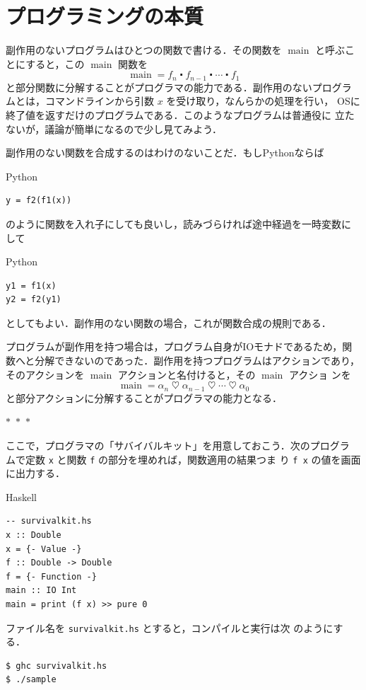 \documentclass[a5paper,twoside,fleqn,draft]{jsbook}
\newcommand{\separator}{\begin{center}$*$~$*$~$*$\end{center}}
\newcommand{\programminglanguage}[1]{\textsf{#1}}
\newcommand{\haskell}{\programminglanguage{Haskell}}
\newcommand{\python}{\programminglanguage{Python}}
\newcommand{\code}[1]{\texttt{#1}}
\newcommand{\filename}[1]{\texttt{#1}}
\newenvironment{haskellcode}{\begin{itembox}[r]{\haskell}}{\end{itembox}}
\newenvironment{pythoncode}{\begin{itembox}[r]{\python}}{\end{itembox}}
\newcommand{\mSpecialFunc}[1]{\mathrm{#1}}
\DeclareMathOperator{\mMainFunc}{\mSpecialFunc{main}}
\newcommand{\mAction}[1]{\mathrm{#1}}
\DeclareMathOperator{\mMain}{\mAction{main}}
\DeclareMathOperator{\mBind}{\heartsuit}
\DeclareMathOperator{\mCompFunc}{\centerdot}
\begin{document}
\section{プログラミングの本質}

副作用のないプログラムはひとつの関数で書ける．その関数を $\mMainFunc$
と呼ぶことにすると，この $\mMainFunc$ 関数を
\begin{equation}
\mMainFunc=f_n\mCompFunc f_{n-1}\mCompFunc\dotsb\mCompFunc f_1
\end{equation}
と部分関数に分解することがプログラマの能力である．副作用のないプログラ
ムとは，コマンドラインから引数 $x$ を受け取り，なんらかの処理を行い，
OSに終了値を返すだけのプログラムである．このようなプログラムは普通役に
立たないが，議論が簡単になるので少し見てみよう．

副作用のない関数を合成するのはわけのないことだ．もし\python ならば
\begin{pythoncode}
\begin{verbatim}
y = f2(f1(x))
\end{verbatim}
\end{pythoncode}
のように関数を入れ子にしても良いし，読みづらければ途中経過を一時変数に
して
\begin{pythoncode}
\begin{verbatim}
y1 = f1(x)
y2 = f2(y1)
\end{verbatim}
\end{pythoncode}
としてもよい．副作用のない関数の場合，これが関数合成の規則である．

プログラムが副作用を持つ場合は，プログラム自身がIOモナドであるため，関
数へと分解できないのであった．副作用を持つプログラムはアクションであり，
そのアクションを $\mMain$ アクションと名付けると，その $\mMain$ アクショ
ンを
\begin{equation}
\mMain=\alpha_n\mBind\alpha_{n-1}\mBind\dotsb\mBind\alpha_0
\end{equation}
と部分アクションに分解することがプログラマの能力となる．


\separator

ここで，プログラマの「サバイバルキット」を用意しておこう．次のプログラ
ムで定数 \code{x} と関数 \code{f} の部分を埋めれば，関数適用の結果つま
り \code{f x} の値を画面に出力する．
\begin{haskellcode}
\begin{verbatim}
-- survivalkit.hs
x :: Double
x = {- Value -}
f :: Double -> Double
f = {- Function -}
main :: IO Int
main = print (f x) >> pure 0
\end{verbatim}
\end{haskellcode}
ファイル名を \filename{survivalkit.hs} とすると，コンパイルと実行は次
のようにする．
\begin{verbatim}
$ ghc survivalkit.hs
$ ./sample
\end{verbatim}%
\end{document}
